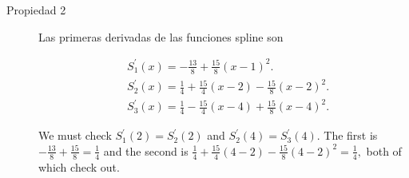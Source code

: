 \begin{frame}
\begin{solution}
\begin{description}
            \item[Propiedad 2]

                Las primeras derivadas de las funciones spline son

                \begin{align*}
                     & S_1^{\prime}\left(x\right)=
                    -\frac{13}{8}+\frac{15}{8}(x-1)^2.                 \\
                     & S_2^{\prime}\left(x\right)=
                    \frac{1}{4}+\frac{15}{4}(x-2)-\frac{15}{8}(x-2)^2. \\
                     & S_3^{\prime}\left(x\right)=
                    \frac{1}{4}-\frac{15}{4}(x-4)+\frac{15}{8}(x-4)^2.
                \end{align*}

                We must check $S_1^{\prime}(2)=S_2^{\prime}(2)$ and
                $S_2^{\prime}(4)=S_3^{\prime}(4)$.
                The first is
                \begin{math}
                    -\frac{13}{8}+
                    \frac{15}{8}=
                    \frac{1}{4}
                \end{math}
                and the second is
                \begin{math}
                    \frac{1}{4}+
                    \frac{15}{4}(4-2)-
                    \frac{15}{8}(4-2)^2=
                    \frac{1}{4},
                \end{math}
                both of which check out.
        \end{description}

    \end{solution}
\end{frame}

